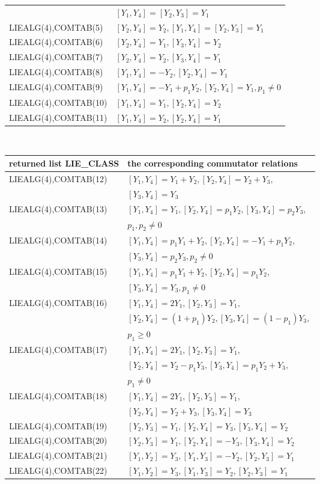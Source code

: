 \begin{tabular}{l|l}
                     &$[Y_1,Y_4]=[Y_2,Y_3]=Y_1$\\[0.1cm]
{LIEALG(4),COMTAB(5)}&$[Y_2,Y_4]=Y_2,[Y_1,Y_4]=[Y_2,Y_3]=Y_1$\\[0.1cm]
{LIEALG(4),COMTAB(6)}&$[Y_2,Y_4]=Y_1,[Y_3,Y_4]=Y_2$\\[0.1cm]
{LIEALG(4),COMTAB(7)}&$[Y_2,Y_4]=Y_2,[Y_3,Y_4]=Y_1$\\[0.1cm]
{LIEALG(4),COMTAB(8)}&$[Y_1,Y_4]=-Y_2,[Y_2,Y_4]=Y_1$\\[0.1cm]
{LIEALG(4),COMTAB(9)}&$[Y_1,Y_4]=-Y_1+p_1 Y_2,[Y_2,Y_4]=Y_1,p_1\neq 0$\\[0.1cm]
{LIEALG(4),COMTAB(10)}&$[Y_1,Y_4]=Y_1,[Y_2,Y_4]=Y_2$\\[0.1cm]
{LIEALG(4),COMTAB(11)}&$[Y_1,Y_4]=Y_2,[Y_2,Y_4]=Y_1$
\end{tabular}\\
\hspace*{0.3cm}\begin{tabular}{l|l}returned list LIE\_CLASS&
the corresponding commutator relations\\[0.1cm]\hline
{LIEALG(4),COMTAB(12)}&$[Y_1,Y_4]=Y_1+Y_2,[Y_2,Y_4]=Y_2+Y_3,$\\
                      &$[Y_3,Y_4]=Y_3$\\[0.1cm]
{LIEALG(4),COMTAB(13)}&$[Y_1,Y_4]=Y_1,[Y_2,Y_4]=p_1 Y_2,[Y_3,Y_4]=p_2 Y_3,$\\
                      &$p_1,p_2\neq 0$\\[0.1cm]
{LIEALG(4),COMTAB(14)}&$[Y_1,Y_4]=p_1 Y_1+Y_2,[Y_2,Y_4]=-Y_1+p_1 Y_2,$\\
                      &$[Y_3,Y_4]=p_2 Y_3,p_2\neq 0$\\[0.1cm]
{LIEALG(4),COMTAB(15)}&$[Y_1,Y_4]=p_1 Y_1+Y_2,[Y_2,Y_4]=p_1 Y_2,$\\
                      &$[Y_3,Y_4]=Y_3,p_1\neq 0$\\[0.1cm]
{LIEALG(4),COMTAB(16)}&$[Y_1,Y_4]=2 Y_1,[Y_2,Y_3]=Y_1,$\\
                      &$[Y_2,Y_4]=(1+p_1) Y_2,[Y_3,Y_4]=(1-p_1) Y_3,$\\
                      &$p_1\geq 0$\\[0.1cm]
{LIEALG(4),COMTAB(17)}&$[Y_1,Y_4]=2 Y_1,[Y_2,Y_3]=Y_1,$\\
                      &$[Y_2,Y_4]=Y_2-p_1 Y_3,[Y_3,Y_4]=p_1 Y_2+Y_3,$\\
                      &$p_1\neq 0$\\[0.1cm]
{LIEALG(4),COMTAB(18)}&$[Y_1,Y_4]=2 Y_1,[Y_2,Y_3]=Y_1,$\\
                      &$[Y_2,Y_4]=Y_2+Y_3,[Y_3,Y_4]=Y_3$\\[0.1cm]
{LIEALG(4),COMTAB(19)}&$[Y_2,Y_3]=Y_1,[Y_2,Y_4]=Y_3,[Y_3,Y_4]=Y_2$\\[0.1cm]
{LIEALG(4),COMTAB(20)}&$[Y_2,Y_3]=Y_1,[Y_2,Y_4]=-Y_3,[Y_3,Y_4]=Y_2$\\[0.1cm]
{LIEALG(4),COMTAB(21)}&$[Y_1,Y_2]=Y_3,[Y_1,Y_3]=-Y_2,[Y_2,Y_3]=Y_1$\\[0.1cm]
{LIEALG(4),COMTAB(22)}&$[Y_1,Y_2]=Y_3,[Y_1,Y_3]=Y_2,[Y_2,Y_3]=Y_1$
\end{tabular}
